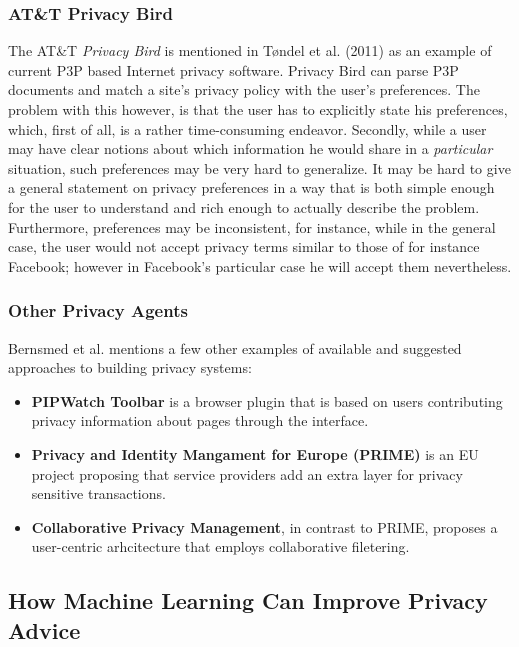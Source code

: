\subsubsection{AT\&T Privacy Bird}
The AT\&T \emph{Privacy Bird} is mentioned in T{\o}ndel et al. (2011) as an example of current P3P based Internet privacy software. Privacy Bird can parse P3P documents and match a site's privacy policy with the user's preferences. The problem with this however, is that the user has to explicitly state his preferences, which, first of all, is a rather time-consuming endeavor. Secondly, while a user may have clear notions about which information he would share in a \emph{particular} situation, such preferences may be very hard to generalize. It may be hard to give a general statement on privacy preferences in a way that is both simple enough for the user to understand and rich enough to actually describe the problem. Furthermore, preferences may be inconsistent, for instance, while in the general case, the user would not accept privacy terms similar to those of for instance Facebook; however in Facebook's particular case he will accept them nevertheless.

\subsubsection{Other Privacy Agents}
Bernsmed et al. mentions a few other examples of available and suggested approaches to building privacy systems:

\begin{itemize}
\item \textbf{PIPWatch Toolbar} is a browser plugin that is based on users contributing privacy information about pages through the interface.
\item \textbf{Privacy and Identity Mangament for Europe (PRIME)} is an EU project proposing that service providers add an extra layer for privacy sensitive transactions.
\item \textbf{Collaborative Privacy Management}, in contrast to PRIME, proposes a user-centric arhcitecture that employs collaborative filetering.
\end{itemize}

\subsection{How Machine Learning Can Improve Privacy Advice}

